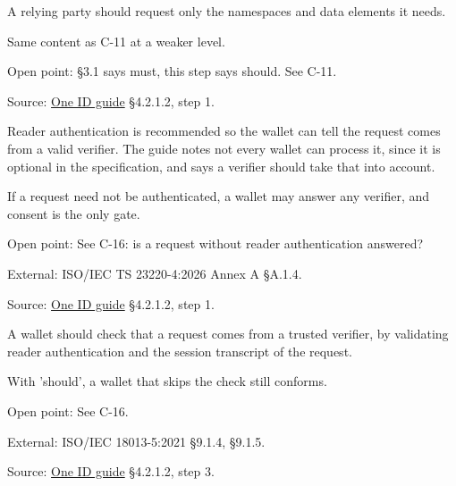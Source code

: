 \begin{definition}
  \label{def:c54}
  \notready
  A relying party should request only the namespaces and data elements it
  needs.

  Same content as C-11 at a weaker level.

  Open point: §3.1 says must, this step says should. See C-11.

  Source:
  \href{https://standards.atlassian.net/wiki/spaces/OneID/pages/2947416082/Technical+Implementation+Guide}{One
  ID guide} §4.2.1.2, step 1.
\end{definition}

\begin{definition}
  \label{def:c55}
  \notready
  Reader authentication is recommended so the wallet can tell the request
  comes from a valid verifier. The guide notes not every wallet can process
  it, since it is optional in the specification, and says a verifier should
  take that into account.

  If a request need not be authenticated, a wallet may answer any verifier,
  and consent is the only gate.

  Open point: See C-16: is a request without reader authentication answered?

  External: ISO/IEC TS 23220-4:2026 Annex A §A.1.4.

  Source:
  \href{https://standards.atlassian.net/wiki/spaces/OneID/pages/2947416082/Technical+Implementation+Guide}{One
  ID guide} §4.2.1.2, step 1.
\end{definition}

\begin{definition}
  \label{def:c57}
  \notready
  A wallet should check that a request comes from a trusted verifier, by
  validating reader authentication and the session transcript of the request.

  With 'should', a wallet that skips the check still conforms.

  Open point: See C-16.

  External: ISO/IEC 18013-5:2021 §9.1.4, §9.1.5.

  Source:
  \href{https://standards.atlassian.net/wiki/spaces/OneID/pages/2947416082/Technical+Implementation+Guide}{One
  ID guide} §4.2.1.2, step 3.
\end{definition}

